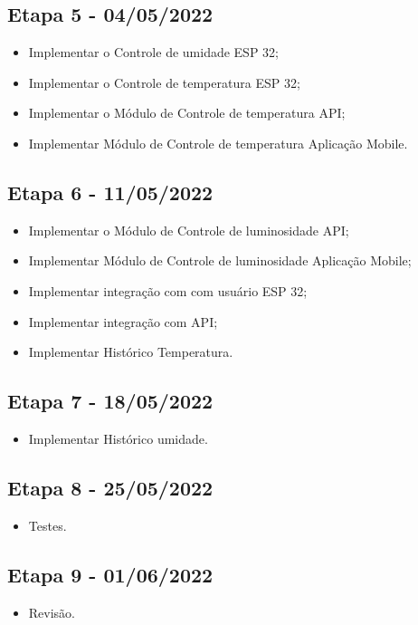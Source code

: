 \documentclass[conference]{IEEEtran}
\begin{document}
\subsection{Etapa 5 - 04/05/2022}
\begin{itemize}
    \item Implementar o Controle de umidade ESP 32;
    \item Implementar o Controle de temperatura ESP 32;
    \item Implementar o Módulo de Controle de temperatura API;
    \item Implementar Módulo de Controle de temperatura Aplicação Mobile.
\end{itemize}

\subsection{Etapa 6 - 11/05/2022}
\begin{itemize}
    \item Implementar o Módulo de Controle de luminosidade API;
    \item Implementar Módulo de Controle de luminosidade Aplicação Mobile;
    \item Implementar integração com com usuário ESP 32;
    \item Implementar integração com API;
    \item Implementar Histórico Temperatura.
\end{itemize}

\subsection{Etapa 7 - 18/05/2022}
\begin{itemize}
    \item Implementar Histórico umidade.
\end{itemize}

\subsection{Etapa 8 - 25/05/2022}
\begin{itemize}
    \item Testes.
\end{itemize}

\subsection{Etapa 9 - 01/06/2022}
\begin{itemize}
    \item Revisão.
\end{itemize}
\end{document}
